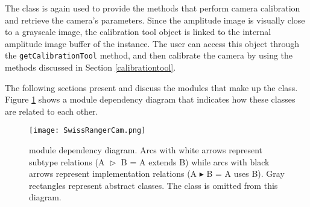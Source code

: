 The \CalibrationTool{} class is again used to provide the methods that perform camera calibration and retrieve
the camera's parameters. Since the amplitude image is visually close to a grayscale image, the calibration tool 
object is linked to the internal amplitude image buffer of the \SwissRangerCam{} instance. The user can 
access this object through the \texttt{get\-Cal\-i\-bra\-tion\-Tool} method, and then calibrate the camera by 
using the methods discussed in Section \ref{calibrationtool}.

The following sections present and discuss the modules that make up the \SwissRangerCam{} class. Figure 
\ref{swissrangercammoduledependency} shows a module dependency diagram that indicates how these 
classes are related to each other. 

\begin{figure}[t]
\begin{center}
\texttt{[image: SwissRangerCam.png]}
%
\caption[\SwissRangerCam{}'s module dependency diagram]{\SwissRangerCam{} module dependency 
diagram. Arcs with white arrows represent subtype relations (A $\vartriangleright$ B = A extends B) while 
arcs with black arrows represent implementation relations (A $\blacktriangleright$ B = A uses B). Gray 
rectangles represent abstract classes. The \ImageBuffer{} class is omitted from this diagram.}
\label{swissrangercammoduledependency}
\end{center}
\end{figure}
